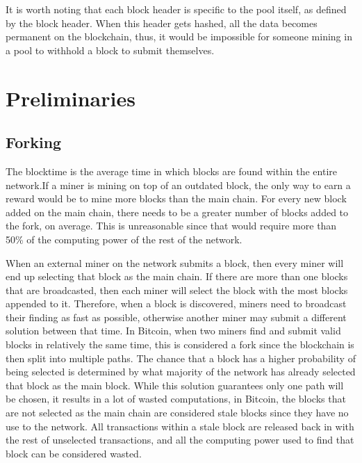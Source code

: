 \documentclass[runningheads]{llncs}
\begin{document}
It is worth noting that each block header is specific to the pool itself, as defined by the block header. When this header gets hashed, all the data becomes permanent on the blockchain, thus, it would be impossible for someone mining in a pool to withhold a block to submit themselves.


\section{Preliminaries}
\subsection{Forking}
The blocktime is the average time in which blocks are found within the entire network.If a miner is mining on top of an outdated block, the only way to earn a reward would be to mine more blocks than the main chain. For every new block added on the main chain, there needs to be a greater number of blocks added to the fork, on average. This is unreasonable since that would require more than 50\% of the computing power of the rest of the network. 

When an external miner on the network submits a block, then every miner will end up selecting that block as the main chain. If there are more than one blocks that are broadcasted, then each miner will select the block with the most blocks appended to it. Therefore, when a block is discovered, miners need to broadcast their finding as fast as possible, otherwise another miner may submit a different solution between that time. In Bitcoin, when two miners find and submit valid blocks in relatively the same time, this is considered a fork since the blockchain is then split into multiple paths. The chance that a block has a higher probability of being selected is determined by what majority of the network has already selected that block as the main block. While this solution guarantees only one path will be chosen, it results in a lot of wasted computations, in Bitcoin, the blocks that are not selected as the main chain are considered stale blocks since they have no use to the network. All transactions within a stale block are released back in with the rest of unselected transactions, and all the computing power used to find that block can be considered wasted.
\end{document}
